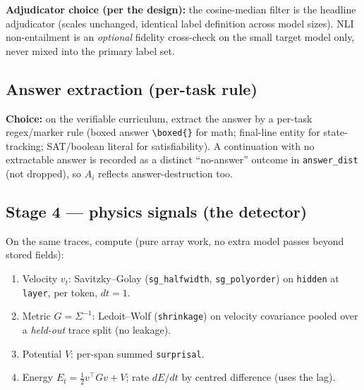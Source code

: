 \documentclass[11pt]{article}
\newcommand{\out}[1]{\texttt{#1}}      %
\newcommand{\param}[1]{\texttt{#1}}    %
\begin{document}
\begin{choice}
\textbf{Adjudicator choice (per the design):} the cosine-median filter is the
headline adjudicator (scales unchanged, identical label definition across model
sizes). NLI non-entailment is an \emph{optional} fidelity cross-check on the small
target model only, never mixed into the primary label set.
\end{choice}

\subsection{Answer extraction (per-task rule)}
\label{sec:t1-answer}
\begin{choice}
\textbf{Choice:} on the verifiable curriculum, extract the answer by a per-task
regex/marker rule (boxed answer \texttt{\textbackslash boxed\{\}} for math;
final-line entity for state-tracking; SAT/boolean literal for satisfiability). A
continuation with no extractable answer is recorded as a distinct ``no-answer''
outcome in \out{answer\_dist} (not dropped), so $A_i$ reflects answer-destruction
too.
\end{choice}

\subsection{Stage 4 --- physics signals (the detector)}
\label{sec:t1-phys}
On the same traces, compute (pure array work, no extra model passes beyond stored
fields):
\begin{enumerate}[leftmargin=1.4em,itemsep=1pt]
\item Velocity $v_t$: Savitzky--Golay (\param{sg\_halfwidth}, \param{sg\_polyorder})
on \out{hidden} at \param{layer}, per token, $dt=1$.
\item Metric $G=\Sigma^{-1}$: Ledoit--Wolf (\param{shrinkage}) on velocity
covariance pooled over a \emph{held-out} trace split (no leakage).
\item Potential $V$: per-span summed \out{surprisal}.
\item Energy $E_t=\tfrac12 v^\top G v + V$; rate $dE/dt$ by centred difference
(uses the lag).
\end{enumerate}
\end{document}
